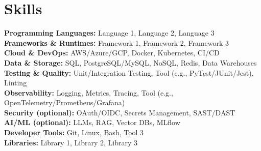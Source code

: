 

\section{Skills}

\resumeSkillListStart
    \small
    \item{
        \textbf{Programming Languages:} Language 1, Language 2, Language 3 \\

        \textbf{Frameworks \& Runtimes:} Framework 1, Framework 2, Framework 3 \\

        \textbf{Cloud \& DevOps:} AWS/Azure/GCP, Docker, Kubernetes, CI/CD \\

        \textbf{Data \& Storage:} SQL, PostgreSQL/MySQL, NoSQL, Redis, Data Warehouses \\

        \textbf{Testing \& Quality:} Unit/Integration Testing, Tool (e.g., PyTest/JUnit/Jest), Linting \\

        \textbf{Observability:} Logging, Metrics, Tracing, Tool (e.g., OpenTelemetry/Prometheus/Grafana) \\

        \textbf{Security (optional):} OAuth/OIDC, Secrets Management, SAST/DAST \\

        \textbf{AI/ML (optional):} LLMs, RAG, Vector DBs, MLflow \\

        \textbf{Developer Tools:} Git, Linux, Bash, Tool 3 \\

        \textbf{Libraries:} Library 1, Library 2, Library 3
    }
\resumeSkillListEnd
